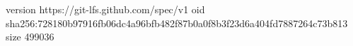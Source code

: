 version https://git-lfs.github.com/spec/v1
oid sha256:728180b97916fb06dc4a96bfb482f87b0a0f8b3f23d6a404fd7887264c73b813
size 499036
